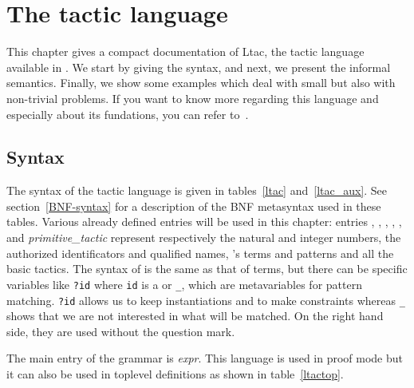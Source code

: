 \chapter{The tactic language}
\label{TacticLanguage}


This chapter gives a compact documentation of Ltac, the tactic
language available in {\Coq}. We start by giving the syntax, and next,
we present the informal semantics. Finally, we show some examples which
deal with small but also with non-trivial problems. If you want to
know more regarding this language and especially about its fundations,
you can refer to~\cite{Del00}.

\section{Syntax}

\def\tacexpr{\textrm{\textsl{expr}}}
\def\tacexprlow{\textrm{\textsl{tacexpr$_1$}}}
\def\tacexprinf{\textrm{\textsl{tacexpr$_2$}}}
\def\tacexprpref{\textrm{\textsl{tacexpr$_3$}}}
\def\atom{\textrm{\textsl{atom}}}
\def\recclause{\textrm{\textsl{rec\_clause}}}
\def\letclause{\textrm{\textsl{let\_clause}}}
\def\matchrule{\textrm{\textsl{match\_rule}}}
\def\contextrule{\textrm{\textsl{context\_rule}}}
\def\contexthyps{\textrm{\textsl{context\_hyps}}}
\def\primitivetactic{\textrm{\textsl{primitive\_tactic}}}
\def\tacarg{\textrm{\textsl{arg}}}
\def\qstring{\textrm{\textsl{string}}}
\def\cpattern{\nterm{cpattern}}

The syntax of the tactic language is given in tables~\ref{ltac}
and~\ref{ltac_aux}. See section~\ref{BNF-syntax} for a description of
the BNF metasyntax used in these tables. Various already defined
entries will be used in this chapter: entries {\naturalnumber},
{\integer}, {\ident}, {\qualid}, {\term}, {\cpattern} and
{\primitivetactic} represent respectively the natural and integer
numbers, the authorized identificators and qualified names, {\Coq}'s
terms and patterns and all the basic tactics. The syntax of
{\cpattern} is the same as that of terms, but there can
be specific variables like {\tt ?id} where {\tt id} is a {\ident} or
{\tt \_}, which are metavariables for pattern matching. {\tt ?id} allows
us to keep instantiations and to make constraints whereas {\tt \_}
shows that we are not interested in what will be matched. On the right
hand side, they are used without the question mark.

The main entry of the grammar is {\tacexpr}. This language is used in
proof mode but it can also be used in toplevel definitions as shown in
table~\ref{ltactop}.

